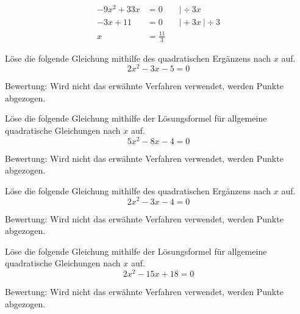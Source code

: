 \documentclass[11pt]{exam}
\begin{document}
\begin{questions}

\noaddpoints
\question[\totalpoints]
\addpoints
\begin{align*}
    -9x^2+33x&=0 && \vert\div 3x\\
    -3x+11&=0 &&\vert+3x\:\vert\div 3\\
    x&=\frac{11}{3}
\end{align*}

\question[4]
Löse die folgende Gleichung mithilfe des quadratischen Ergänzens nach $x$ auf. \[2x^2-3x-5=0\]
\begin{small}
    Bewertung: Wird nicht das erwähnte Verfahren verwendet, werden Punkte abgezogen.
\end{small}

\question[4]
Löse die folgende Gleichung mithilfe der Lösungsformel für allgemeine quadratische Gleichungen nach $x$ auf. \[5x^2-8x-4=0\]
\begin{small}
    Bewertung: Wird nicht das erwähnte Verfahren verwendet, werden Punkte abgezogen.
\end{small}

\question[4]
Löse die folgende Gleichung mithilfe des quadratischen Ergänzens nach $x$ auf. \[2x^2-3x-4=0\]
\begin{small}
    Bewertung: Wird nicht das erwähnte Verfahren verwendet, werden Punkte abgezogen.
\end{small}

\question[4]
Löse die folgende Gleichung mithilfe der Lösungsformel für allgemeine quadratische Gleichungen nach $x$ auf. \[2x^2-15x+18=0\]
\begin{small}
    Bewertung: Wird nicht das erwähnte Verfahren verwendet, werden Punkte abgezogen.
\end{small}


\end{questions}
\end{document}
